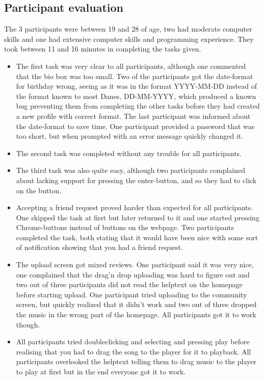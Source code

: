 \subsection{Participant evaluation}
The 3 participants were between 19 and 28 of age, two had moderate computer skills and one had extensive computer skills and programming experience. They took between 11 and 16 minutes in completing the tasks given.
\begin{itemize}
	\item The first task was very clear to all participants, although one commented that the bio box was too small. Two of the participants got the date-format for birthday wrong, seeing as it was in the format YYYY-MM-DD instead of the format known to most Danes, DD-MM-YYYY, which produced a known bug preventing them from completing the other tasks before they had created a new profile with correct format. The last participant was informed about the date-format to save time. One participant provided a password that was too short, but when prompted with an error message quickly changed it.
	\item The second task was completed without any trouble for all participants.
	\item The third task was also quite easy, although two participants complained about lacking support for pressing the enter-button, and so they had to click on the button.
	\item Accepting a friend request proved harder than expected for all participants. One skipped the task at first but later returned to it and one started pressing Chrome-buttons instead of buttons on the webpage. Two participants completed the task, both stating that it would have been nice with some sort of notification showing that you had a friend request.
	\item The upload screen got mixed reviews. One participant said it was very nice, one complained that the drag'n drop uploading was hard to figure out and two out of three participants did not read the helptext on the homepage before starting upload. One participant tried uploading to the community screen, but quickly realized that it didn't work and two out of three dropped the music in the wrong part of the homepage. All participants got it to work though.
	\item All participants tried doubleclicking and selecting and pressing play before realising that you had to drag the song to the player for it to playback. All participants overlooked the helptext telling them to drag music to the player to play at first but in the end everyone got it to work.

\end{itemize}
